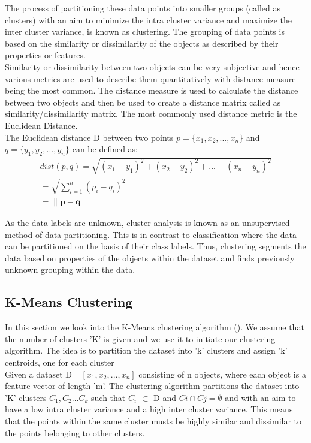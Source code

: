 The process of partitioning these data points into smaller groups (called as clusters) with an aim to minimize the intra cluster variance and maximize the inter cluster variance, is known as clustering. The grouping of data points is based on the similarity or dissimilarity of the objects as described by their properties or features.\\

Similarity or dissimilarity between two objects can be very subjective and hence various metrics are used to describe them quantitatively with distance measure being the most common. The distance measure is used to calculate the distance between two objects and then be used to create a distance matrix called as similarity/dissimilarity matrix. The most commonly used distance metric is the Euclidean Distance.\\

The Euclidean distance D between two points $p =\{x_1, x_2, ... , x_n\}$ and $q =\{y_1, y_2, ... , y_n\}$ can be defined as:
\begin{equation}\label{eq: Euclidean dist}
\begin{split}
dist(p,q) =  \sqrt{(x_1 - y_1)^2 + (x_2 - y_2)^2 + ... +(x_n - y_n)^2 } \\
=  \sqrt{\sum_{i=1}^{n}(p_i - q_i)^2} \\
= \lVert \mathbf{p-q} \rVert
\end{split}
\end{equation}

As the data labels are unknown, cluster analysis is known as an unsupervised method of data partitioning. This is in contrast to classification where the data can be partitioned on the basis of their class labels. Thus, clustering segments the data based on properties of the objects within the dataset and finds previously unknown grouping within the data.

\subsection{K-Means Clustering}\label{sec:kmeans}
In this section we look into the K-Means clustering algorithm (\citet{macqueen1967some}). We assume that the number of clusters 'K' is given and we use it to initiate our clustering algorithm. The idea is to partition the dataset into 'k' clusters and assign 'k' centroids, one for each cluster \\

Given a dataset D =$[x_1,x_2,...,x_n]$ consisting of n objects, where each object is a feature vector of length 'm'. The clustering algorithm partitions the dataset into 'K' clusters $C_1,C_2...C_k$ such that $C_i$ $\subset$ D and $Ci \cap Cj = \emptyset$ and with an aim to have a low intra cluster variance and a high inter cluster variance. This means that the points within the same cluster musts be highly similar and dissimilar to the points belonging to other clusters.\\


